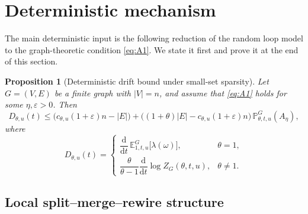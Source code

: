 \documentclass[11pt]{article}
\newtheorem{proposition}[theorem]{Proposition}
\theoremstyle{remark}
\theoremstyle{plain}
\newcommand{\Pbb}{\mathbb{P}}
\newcommand{\Ebb}{\mathbb{E}}
\newcommand{\1}{\mathbbm{1}}
\newcommand{\dd}{\mathrm{d}}
\begin{document}
\section{Deterministic mechanism}

The main deterministic input is the following reduction of the random loop model
to the graph-theoretic condition \eqref{eq:A1}. We state it first and prove it at
the end of this section.

\begin{proposition}[Deterministic drift bound under small-set sparsity]
\label{prop:deterministic-drift}
Let \(G=(V,E)\) be a finite graph with \(|V|=n\), and assume that \eqref{eq:A1}
holds for some \(\eta,\varepsilon>0\). Then
\begin{equation}
D_{\theta,u}(t)
\le
\bigl(c_{\theta,u}(1+\varepsilon)n-|E|\bigr)
+
\bigl((1+\theta)|E|-c_{\theta,u}(1+\varepsilon)n\bigr)\,
\Pbb^G_{\theta,t,u}(A_\eta),
\label{eq:deterministic-drift}
\end{equation}
where
\[
D_{\theta,u}(t)=
\begin{cases}
\dfrac{\dd}{\dd t}\,\Ebb^G_{1,t,u}\bigl[\lambda(\omega)\bigr], & \theta=1,\\[1.2ex]
\dfrac{\theta}{\theta-1}\dfrac{\dd}{\dd t}\log Z_G(\theta,t,u), & \theta\neq 1.
\end{cases}
\]
\end{proposition}

\subsection{Local split--merge--rewire structure}
\end{document}
